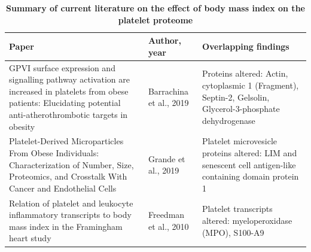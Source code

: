\documentclass[11pt,twoside]{bristolthesis}
\begin{document}
\begin{landscape}\begin{table}

\caption[Summary of current literature on the effect of body mass index on the platelet proteome]{\label{tab:proteome-lit}\textbf{Summary of current literature on the effect of body mass index on the platelet proteome}}
\centering
\begin{tabu} to 
\toprule
Paper & Author, year & Overlapping findings\\
\midrule
GPVI surface expression and signalling pathway activation are increased in platelets from obese patients: Elucidating potential anti-atherothrombotic targets in obesity & Barrachina et al., 2019 & Proteins altered: Actin, cytoplasmic 1 (Fragment), Septin-2, Gelsolin, Glycerol-3-phosphate dehydrogenase\\
Platelet-Derived Microparticles From Obese Individuals: Characterization of Number, Size, Proteomics, and Crosstalk With Cancer and Endothelial Cells & Grande et al., 2019 & Platelet microvesicle proteins altered: LIM and senescent cell antigen-like containing domain protein 1\\
Relation of platelet and leukocyte inflammatory transcripts to body mass index in the Framingham heart study & Freedman et al., 2010 & Platelet transcripts altered: myeloperoxidase (MPO), S100-A9\\
\bottomrule
\end{tabu}
\end{table}
\end{landscape}
\end{document}
